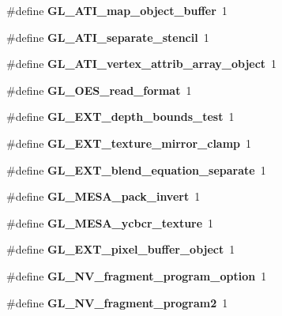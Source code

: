 \begin{DoxyCompactItemize}
\item 
\#define {\bfseries G\+L\+\_\+\+A\+T\+I\+\_\+map\+\_\+object\+\_\+buffer}~1\label{_s_d_l__opengl_8h_abf04edf0b5ec82043e070d67eddd1016}

\item 
\#define {\bfseries G\+L\+\_\+\+A\+T\+I\+\_\+separate\+\_\+stencil}~1\label{_s_d_l__opengl_8h_a532fc25b5b040b2c76f6d4c59980a458}

\item 
\#define {\bfseries G\+L\+\_\+\+A\+T\+I\+\_\+vertex\+\_\+attrib\+\_\+array\+\_\+object}~1\label{_s_d_l__opengl_8h_abf7fa794c7635627ce501f4738db3d58}

\item 
\#define {\bfseries G\+L\+\_\+\+O\+E\+S\+\_\+read\+\_\+format}~1\label{_s_d_l__opengl_8h_a8023eda95b8581de8cf2590fd1b0ba5a}

\item 
\#define {\bfseries G\+L\+\_\+\+E\+X\+T\+\_\+depth\+\_\+bounds\+\_\+test}~1\label{_s_d_l__opengl_8h_ab74f5cdfd8e6494a7c25fea5dd0fac6c}

\item 
\#define {\bfseries G\+L\+\_\+\+E\+X\+T\+\_\+texture\+\_\+mirror\+\_\+clamp}~1\label{_s_d_l__opengl_8h_a1aee22b7b448c4907a38750d7d3524b0}

\item 
\#define {\bfseries G\+L\+\_\+\+E\+X\+T\+\_\+blend\+\_\+equation\+\_\+separate}~1\label{_s_d_l__opengl_8h_a6a911c276d73db9e85216789269584cc}

\item 
\#define {\bfseries G\+L\+\_\+\+M\+E\+S\+A\+\_\+pack\+\_\+invert}~1\label{_s_d_l__opengl_8h_a2e8fccab44e86657b79ad9409181f714}

\item 
\#define {\bfseries G\+L\+\_\+\+M\+E\+S\+A\+\_\+ycbcr\+\_\+texture}~1\label{_s_d_l__opengl_8h_aea3d364fbd326fe38e1b1512e5a0c835}

\item 
\#define {\bfseries G\+L\+\_\+\+E\+X\+T\+\_\+pixel\+\_\+buffer\+\_\+object}~1\label{_s_d_l__opengl_8h_aa40cd0fdb6ba128c275b5be0112f16ee}

\item 
\#define {\bfseries G\+L\+\_\+\+N\+V\+\_\+fragment\+\_\+program\+\_\+option}~1\label{_s_d_l__opengl_8h_ae00827f3e29b57d52a998f02e76e8c61}

\item 
\#define {\bfseries G\+L\+\_\+\+N\+V\+\_\+fragment\+\_\+program2}~1\label{_s_d_l__opengl_8h_a215aacabc54d28b35a7962ce16aaea48}


\end{DoxyCompactItemize}
